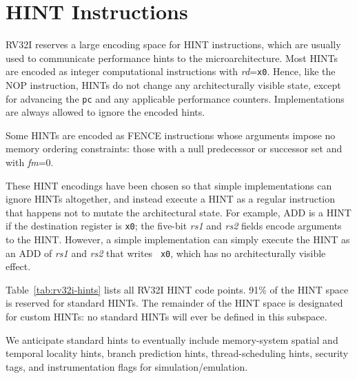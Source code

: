 \section{HINT Instructions}
\label{sec:rv32i-hints}

RV32I reserves a large encoding space for HINT instructions, which are
usually used to communicate performance hints to the
microarchitecture.  Most HINTs are encoded as integer computational
instructions with {\em rd}={\tt x0}.  Hence, like the NOP instruction,
HINTs do not change any architecturally visible state, except for
advancing the {\tt pc} and any applicable performance counters.
Implementations are always allowed to ignore the encoded hints.

Some HINTs are encoded as FENCE instructions whose arguments impose no
memory ordering constraints: those with a null predecessor or successor
set and with {\em fm}=0.

\begin{commentary}
These HINT encodings have been chosen so that simple implementations can ignore
HINTs altogether, and instead execute a HINT as a regular
instruction that happens not to mutate the architectural state.  For example, ADD is
a HINT if the destination register is {\tt x0}; the five-bit {\em rs1} and {\em
rs2} fields encode arguments to the HINT.  However, a simple implementation can
simply execute the HINT as an ADD of {\em rs1} and {\em rs2} that writes {\tt
x0}, which has no architecturally visible effect.
\end{commentary}

Table~\ref{tab:rv32i-hints} lists all RV32I HINT code points.  91\% of the HINT
space is reserved for standard HINTs.  The
remainder of the HINT space is designated for custom HINTs: no standard HINTs
will ever be defined in this subspace.

\begin{commentary}
We anticipate
standard hints to eventually include memory-system spatial and
temporal locality hints, branch prediction hints, thread-scheduling
hints, security tags, and instrumentation flags for
simulation/emulation.
\end{commentary}

